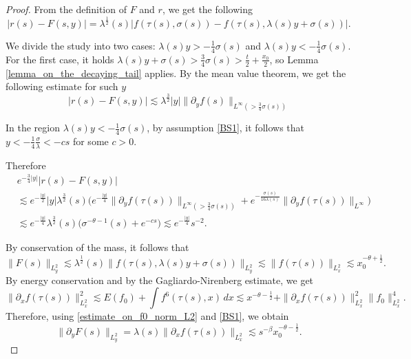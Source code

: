 \documentclass[16pt,english, oneside,reqno]{smfart}
\begin{document}
\begin{proof}
    \vspace{0.4cm}
    From the definition of $F$ and $r$, we get the following
    \begin{equation}
        \lvert r(s)-F(s,y) \rvert = \lambda^{\frac{1}{2}}(s)\lvert f(\tau(s),\sigma(s))   -f(\tau(s),\lambda(s)y+ \sigma(s)) \rvert.
    \end{equation}
    
    We divide the study into two cases: $\lambda(s)y>-\frac{1}{4}\sigma(s)$ and $\lambda(s)y<-\frac{1}{4}\sigma(s)$.
    For the first case, it holds $\lambda(s)y + \sigma(s) > \frac{3}{4}\sigma(s) > \frac t2 +\frac{x_0}{2}$, so Lemma \ref{lemma_on_the_decaying_tail} applies. By the mean value theorem, we get the following estimate for such $y$
    \begin{equation}
        \big\lvert r(s) - F(s,y)\big\lvert \lesssim \lambda^{\frac 32}|y|\|\partial_y f(s)\|_{L^{\infty}(>\frac 34 \sigma(s))}
    \end{equation}
    
    In the region $\lambda(s)y<-\frac{1}{4}\sigma(s)$, by assumption \eqref{BS1}, it follows that $y< -\frac 14 \frac{\sigma}{\lambda} < -c s$ for some $c>0$.
    
    Therefore
    \begin{equation}
    \begin{split}
        &e^{-\frac{3}{4}|y|} \big\lvert r(s)-F(s,y) \big\rvert \\
        &\lesssim
        e^{-\frac{|y|}{2}}|y|\lambda^{\frac{3}{2}}(s) \Big( e^{-\frac{|y|}{4}}\|\partial_y f(\tau(s)) \|_{L^{\infty}(>\frac{3}{4}\sigma(s))} + e^{-\frac{\sigma(s)}{16 \lambda(s)}} \| \partial_y f(\tau(s))\|_{L^{\infty}} \Big)\\
        &\lesssim 
        e^{-\frac{|y|}{4}}\lambda^{\frac{3}{2}}(s) \Big( \sigma^{-\theta-1}(s) + e^{-cs}\Big) \lesssim e^{-\frac{|y|}{4}}s^{-2}.
    \end{split}
    \end{equation}


By conservation of the mass, it follows that
\begin{equation}
    \| F(s)\|_{L^2_y} \lesssim \lambda^{\frac{1}{2}}(s)\| f(\tau(s),\lambda(s)y+\sigma(s))\|_{L^2_y} \lesssim \|f(\tau(s))\|_{L^2_x} \lesssim x^{-\theta+\frac{1}{2}}_0.
\end{equation}
By energy conservation and by the Gagliardo-Nirenberg estimate, we get
\begin{equation}
    \|\partial_x f(\tau(s))\|^2_{L^2_x} \lesssim E(f_0) + \int f^6(\tau(s),x)\,dx
    \lesssim x^{-\theta-\frac{1}{2}} + \|\partial_x f(\tau(s))\|^2_{L^2_x}\| f_0\|^4_{L^2_x}.
\end{equation}
Therefore, using \eqref{estimate_on_f0_norm_L2} and \eqref{BS1}, we obtain 
\begin{equation}
    \|\partial_yF(s)\|_{L^2_y} = \lambda(s)\|\partial_x f(\tau(s))\|_{L^2_x} \lesssim s^{-\beta} x^{-\theta-\frac{1}{2}}_0.
\end{equation}


\end{proof}
\end{document}
